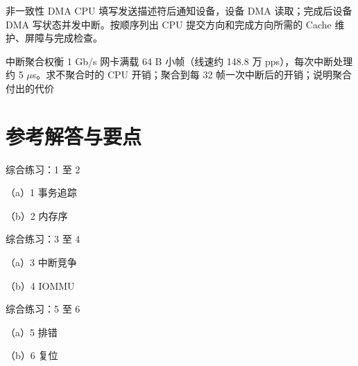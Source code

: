 \begin{chapterexercise}{非一致性 DMA}
CPU 填写发送描述符后通知设备，设备 DMA 读取；完成后设备 DMA 写状态并发中断。按顺序列出 CPU 提交方向和完成方向所需的 Cache 维护、屏障与完成检查。
\end{chapterexercise}

\begin{chapterexercise}{中断聚合权衡}
1 Gb/s 网卡满载 64 B 小帧（线速约 148.8 万 pps），每次中断处理约 5 $\mu$s。求不聚合时的 CPU 开销；聚合到每 32 帧一次中断后的开销；说明聚合付出的代价
\end{chapterexercise}

\section*{参考解答与要点}

\begin{chapteranswer}{综合练习：1 至 2}
\begin{answersubproblem}{（a）1}
事务追踪
\end{answersubproblem}
\begin{answersubproblem}{（b）2}
内存序
\end{answersubproblem}
\end{chapteranswer}

\begin{chapteranswer}{综合练习：3 至 4}
\begin{answersubproblem}{（a）3}
中断竞争
\end{answersubproblem}
\begin{answersubproblem}{（b）4}
IOMMU
\end{answersubproblem}
\end{chapteranswer}

\begin{chapteranswer}{综合练习：5 至 6}
\begin{answersubproblem}{（a）5}
排错
\end{answersubproblem}
\begin{answersubproblem}{（b）6}
复位
\end{answersubproblem}
\end{chapteranswer}

